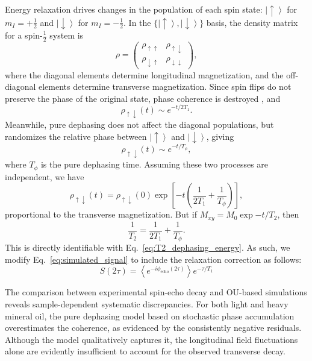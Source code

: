 \documentclass[%
 reprint,
 amsmath,amssymb,
 aps,
]{revtex4-2}
\begin{document}
Energy relaxation drives changes in the population of each spin state: $\left\lvert\uparrow\right\rangle$ for $m_I = +\tfrac{1}{2}$ and $\left\lvert\downarrow\right\rangle$ for $m_I = -\tfrac{1}{2}$. In the $\{\left\lvert\uparrow\right\rangle ,\left\lvert\downarrow\right\rangle\}$ basis, the density matrix for a spin-$\tfrac{1}{2}$ system is
\begin{equation*}
    \rho = \begin{pmatrix}
        \rho_{\uparrow\uparrow} & \rho_{\uparrow\downarrow}\\
        \rho_{\downarrow\uparrow} & \rho_{\downarrow\downarrow}
    \end{pmatrix},
\end{equation*}
where the diagonal elements determine longitudinal magnetization, and the off-diagonal elements determine transverse magnetization. Since spin flips do not preserve the phase of the original state, phase coherence is destroyed \cite{Levitt2008}, and
\begin{equation*}
    \rho_{\uparrow\downarrow} (t) \sim e^{-t/2T_1}.
\end{equation*}
Meanwhile, pure dephasing does not affect the diagonal populations, but randomizes the relative phase between $\left\lvert\uparrow\right\rangle$ and $\left\lvert\downarrow\right\rangle$, giving
\begin{equation*}
    \rho_{\uparrow\downarrow} (t) \sim e^{-t/T_{\phi}},
\end{equation*}
where $T_{\phi}$ is the pure dephasing time. Assuming these two processes are independent, we have
\begin{equation*}
    \rho_{\uparrow\downarrow} (t) = \rho_{\uparrow\downarrow} (0) \exp{\left[-t\left(\frac{1}{2T_1} + \frac{1}{T_{\phi}}\right)\right]},
\end{equation*}
proportional to the transverse magnetization. But if $M_{xy}=M_0\exp{-t/T_2}$, then
\begin{equation}
    \frac{1}{T_2} = \frac{1}{2T_1} + \frac{1}{T_{\phi}}.
    \label{eq:dephasing_plus_relaxation}
\end{equation}
This is directly identifiable with Eq.~\ref{eq:T2_dephasing_energy}. As such, we modify Eq.~\ref{eq:simulated_signal} to include the relaxation correction as follows:
\begin{equation*}
    S(2\tau) = \left\langle e^{-i\phi_{\text{echo}} (2\tau)}\right\rangle e^{-\tau/T_1}
\end{equation*}

The comparison between experimental spin-echo decay and OU-based simulations reveals sample-dependent systematic discrepancies. For both light and heavy mineral oil, the pure dephasing model based on stochastic phase accumulation overestimates the coherence, as evidenced by the consistently negative residuals. Although the model qualitatively captures it, the longitudinal field fluctuations alone are evidently insufficient to account for the observed transverse decay.
\end{document}
